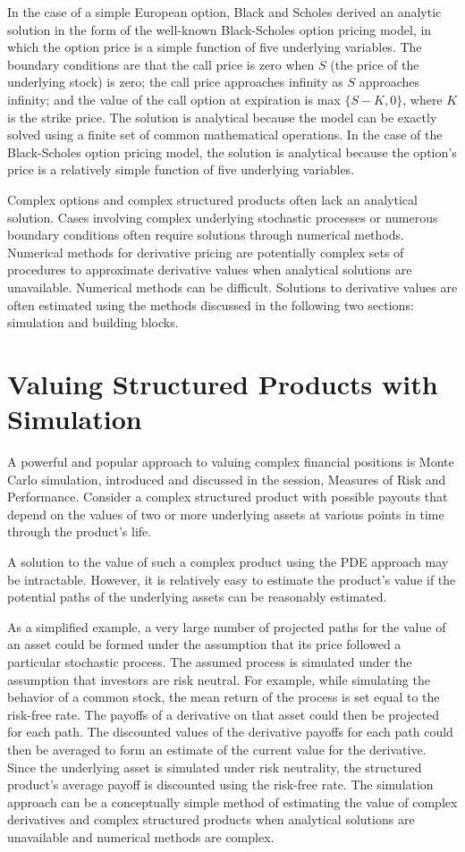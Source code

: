 \documentclass[11pt]{article}
\begin{document}
In the case of a simple European option, Black and Scholes derived an analytic solution in the form of the well-known Black-Scholes option pricing model, in which the option price is a simple function of five underlying variables. The boundary conditions are that the call price is zero when $S$ (the price of the underlying stock) is zero; the call price approaches infinity as $S$ approaches infinity; and the value of the call option at expiration is max $\{S-K, 0\}$, where $K$ is the strike price. The solution is analytical because the model can be exactly solved using a finite set of common mathematical operations. In the case of the Black-Scholes option pricing model, the solution is analytical because the option's price is a relatively simple function of five underlying variables.

Complex options and complex structured products often lack an analytical solution. Cases involving complex underlying stochastic processes or numerous boundary conditions often require solutions through numerical methods. Numerical methods for derivative pricing are potentially complex sets of procedures to approximate derivative values when analytical solutions are unavailable. Numerical methods can be difficult. Solutions to derivative values are often estimated using the methods discussed in the following two sections: simulation and building blocks.

\section*{Valuing Structured Products with Simulation}
A powerful and popular approach to valuing complex financial positions is Monte Carlo simulation, introduced and discussed in the session, Measures of Risk and Performance. Consider a complex structured product with possible payouts that depend on the values of two or more underlying assets at various points in time through the product's life.

A solution to the value of such a complex product using the PDE approach may be intractable. However, it is relatively easy to estimate the product's value if the potential paths of the underlying assets can be reasonably estimated.

As a simplified example, a very large number of projected paths for the value of an asset could be formed under the assumption that its price followed a particular stochastic process. The assumed process is simulated under the assumption that investors are risk neutral. For example, while simulating the behavior of a common stock, the mean return of the process is set equal to the risk-free rate. The payoffs of a derivative on that asset could then be projected for each path. The discounted values of the derivative payoffs for each path could then be averaged to form an estimate of the current value for the derivative. Since the underlying asset is simulated under risk neutrality, the structured product's average payoff is discounted using the risk-free rate. The simulation approach can be a conceptually simple method of estimating the value of complex derivatives and complex structured products when analytical solutions are unavailable and numerical methods are complex.
\end{document}
